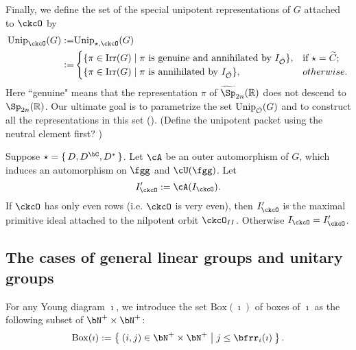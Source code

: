 \documentclass[counting_main.tex]{subfiles}
\begin{document}
 Finally, we define the set of the special unipotent representations of $G$
 attached to $\ckcO$ by
 \[
   \begin{split}
     \Unip_{\ckcO}(G):=&  \Unip_{\star, \ckcO}(G) \\
     :=& \begin{cases}
       \{\pi\in \Irr(G)\mid \pi \textrm{ is genuine  and annihilated by } I_{\check \CO}\}, & \text{if } \star =\widetilde C;\\
       \{\pi\in \Irr(G)\mid \pi \textrm{ is annihilated by } I_{\check \CO}\}, & otherwise.\\
     \end{cases}
   \end{split}
 \]
 Here ``genuine" means that the representation $\pi$ of
 $\widetilde \Sp_{2n}(\R)$ does not descend to $\Sp_{2n}(\R)$. Our ultimate goal
 is to parametrize the set $\mathrm{Unip}_{\check {{\mathcal {O}}}}(G)$ and to construct all the
 representations in this set (\cite{BMSZ2}). (Define the unipotent packet using
 the neutral element first? )

\begin{remark}\label{rmk:OII}
  Suppose $\star=\set{D,D^{\bC},D^{*}}$. Let $\cA$ be an outer automorphism of
  $G$, which induces an automorphism on $\fgg$ and $\cU(\fgg)$. Let
  \[
    I'_{\ckcO}:=\cA(I_{\ckcO}).
  \]
  If $\ckcO$ has only even rows (i.e. $\ckcO$ is very even), then $I'_{\ckcO}$
  is the maximal primitive ideal attached to the nilpotent orbit $\ckcO_{II}$.
  Otherwise $I_{\ckcO}=I'_{\ckcO}$.
\end{remark}



\subsection{The cases of general linear groups and unitary groups}

For any Young diagram $\imath$, we introduce the set $\mathrm{Box}(\imath)$ of
boxes of $\imath$ as the following subset of $\bN^+\times \bN^+$:
\begin{equation}\label{eq:BOX}
  \mathrm{Box}(\imath):=\Set{(i,j)\in\bN^+\times \bN^+| j\leq \bfrr_i(\imath)}.
\end{equation}
\end{document}
